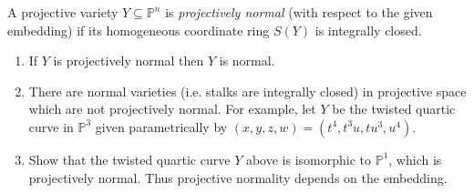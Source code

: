 \begin{exercise}
\label{exercise-projectively-normal-vars}
A projective variety $Y \subseteq
\mathbb{P}^n$ is {\it projectively normal} 
(with respect to the given embedding)
if its homogeneous coordinate ring
$S(Y)$ is integrally closed.
\begin{enumerate}
\item If $Y$ is projectively normal
then $Y$ is normal.
\item There are normal varieties 
(i.e. stalks are integrally closed)
in projective space which are not 
projectively normal.
For example, let $Y$ be the twisted
quartic curve in $\mathbb{P}^3$
given parametrically by
$(x,y,z,w)=(t^4,t^3u,tu^3,u^4)$.
\item Show that the twisted quartic curve
$Y$ above is isomorphic to $\mathbb{P}^1$,
which is projectively normal. Thus projective
normality depends on the embedding.
\end{enumerate}
\end{exercise}


